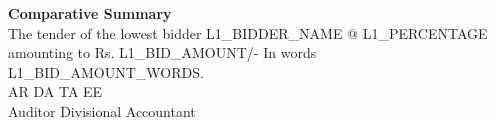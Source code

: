\documentclass{article}
\begin{document}
\begin{flushleft}
    \textbf{Comparative Summary} \\
    The tender of the lowest bidder {L1_BIDDER_NAME} @ {L1_PERCENTAGE} amounting to Rs. {L1_BID_AMOUNT}/- In words {L1_BID_AMOUNT_WORDS}. \\
    \vspace{0.2cm}
    AR \quad DA \quad TA \quad EE \\
    \vspace{0.5cm}
    Auditor \quad Divisional Accountant
\end{flushleft}
\end{document}
